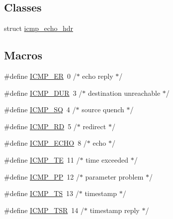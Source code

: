 \subsection*{Classes}
\begin{DoxyCompactItemize}
\item 
struct \hyperlink{structicmp__echo__hdr}{icmp\+\_\+echo\+\_\+hdr}
\end{DoxyCompactItemize}
\subsection*{Macros}
\begin{DoxyCompactItemize}
\item 
\#define \hyperlink{openmote-cc2538_2lwip_2src_2include_2lwip_2prot_2icmp_8h_af1ff8912ae85b066d9dbe6caf3334ab7}{I\+C\+M\+P\+\_\+\+ER}~0    /$\ast$ echo reply $\ast$/
\item 
\#define \hyperlink{openmote-cc2538_2lwip_2src_2include_2lwip_2prot_2icmp_8h_a87f8266c067fb604419fbf17c0d57d64}{I\+C\+M\+P\+\_\+\+D\+UR}~3    /$\ast$ destination unreachable $\ast$/
\item 
\#define \hyperlink{openmote-cc2538_2lwip_2src_2include_2lwip_2prot_2icmp_8h_aeaa5cc8a0b5b0c7ffe590991b3b2a262}{I\+C\+M\+P\+\_\+\+SQ}~4    /$\ast$ source quench $\ast$/
\item 
\#define \hyperlink{openmote-cc2538_2lwip_2src_2include_2lwip_2prot_2icmp_8h_af8671e386aaa07888ad2bcb6150b113f}{I\+C\+M\+P\+\_\+\+RD}~5    /$\ast$ redirect $\ast$/
\item 
\#define \hyperlink{openmote-cc2538_2lwip_2src_2include_2lwip_2prot_2icmp_8h_ad58231410d58e34b455328b888a9e73c}{I\+C\+M\+P\+\_\+\+E\+C\+HO}~8    /$\ast$ echo $\ast$/
\item 
\#define \hyperlink{openmote-cc2538_2lwip_2src_2include_2lwip_2prot_2icmp_8h_a58e03a47804158d97a9c069cc2204797}{I\+C\+M\+P\+\_\+\+TE}~11    /$\ast$ time exceeded $\ast$/
\item 
\#define \hyperlink{openmote-cc2538_2lwip_2src_2include_2lwip_2prot_2icmp_8h_a495e2e90e09c924c16ad8e6fef4b89dc}{I\+C\+M\+P\+\_\+\+PP}~12    /$\ast$ parameter problem $\ast$/
\item 
\#define \hyperlink{openmote-cc2538_2lwip_2src_2include_2lwip_2prot_2icmp_8h_a776eca11e543699d8e55d470b3809a05}{I\+C\+M\+P\+\_\+\+TS}~13    /$\ast$ timestamp $\ast$/
\item 
\#define \hyperlink{openmote-cc2538_2lwip_2src_2include_2lwip_2prot_2icmp_8h_a01f3814d260088de9777de2634130070}{I\+C\+M\+P\+\_\+\+T\+SR}~14    /$\ast$ timestamp reply $\ast$/

\end{DoxyCompactItemize}
